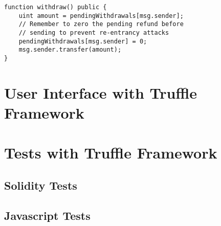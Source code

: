 \begin{lstlisting}[language=Solidity]
function withdraw() public {
    uint amount = pendingWithdrawals[msg.sender];
    // Remember to zero the pending refund before
    // sending to prevent re-entrancy attacks
    pendingWithdrawals[msg.sender] = 0;
    msg.sender.transfer(amount);
}
\end{lstlisting}

\newpage

\section{User Interface with Truffle Framework}\label{sec:truffle}

\section{Tests with Truffle Framework}\label{sec:truffleTest}

\subsection{Solidity Tests}\label{sec:solTest}

\subsection{Javascript Tests}\label{sec:jsTest}


\chapterend


